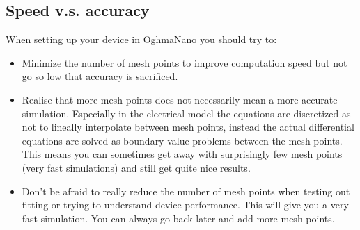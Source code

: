 \subsection{Speed v.s. accuracy}
When setting up your device in OghmaNano you should try to:
\begin{itemize}
  \item Minimize the number of mesh points to improve computation speed but not go so low that accuracy is sacrificed.
  \item Realise that more mesh points does not necessarily mean a more accurate simulation. Especially in the electrical model the equations are discretized as not to lineally interpolate between mesh points, instead the actual differential equations are solved as boundary value problems between the mesh points. This means you can sometimes get away with surprisingly few mesh points (very fast simulations) and still get quite nice results.
  \item Don't be afraid to really reduce the number of mesh points when testing out fitting or trying to understand device performance.  This will give you a very fast simulation. You can always go back later and add more mesh points.
\end{itemize}

